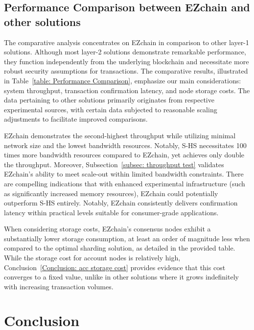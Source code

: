 \documentclass[conference]{IEEEtran}
\begin{document}
\subsection{Performance Comparison between EZchain and other solutions}
\label{subsec: Performance Comparison}


The comparative analysis concentrates on EZchain in comparison to other layer-1 solutions. Although most layer-2 solutions demonstrate remarkable performance, they function independently from the underlying blockchain and necessitate more robust security assumptions for transactions. The comparative results, illustrated in Table~\ref{table: Performance Comparison}, emphasize our main considerations: system throughput, transaction confirmation latency, and node storage costs. The data pertaining to other solutions primarily originates from respective experimental sources, with certain data subjected to reasonable scaling adjustments to facilitate improved comparisons.

EZchain demonstrates the second-highest throughput while utilizing minimal network size and the lowest bandwidth resources. Notably, S-HS necessitates 100 times more bandwidth resources compared to EZchain, yet achieves only double the throughput. Moreover, Subsection~\ref{subsec: throughput test} validates EZchain's ability to meet scale-out within limited bandwidth constraints. There are compelling indications that with enhanced experimental infrastructure (such as significantly increased memory resources), EZchain could potentially outperform S-HS entirely. Notably, EZchain consistently delivers confirmation latency within practical levels suitable for consumer-grade applications.

When considering storage costs, EZchain's consensus nodes exhibit a substantially lower storage consumption, at least an order of magnitude less when compared to the optimal sharding solution, as detailed in the provided table. While the storage cost for account nodes is relatively high, Conclusion~\ref{Conclusion: acc storage cost} provides evidence that this cost converges to a fixed value, unlike in other solutions where it grows indefinitely with increasing transaction volumes.

\section{Conclusion}
\label{sec: Conclusion}
\end{document}
